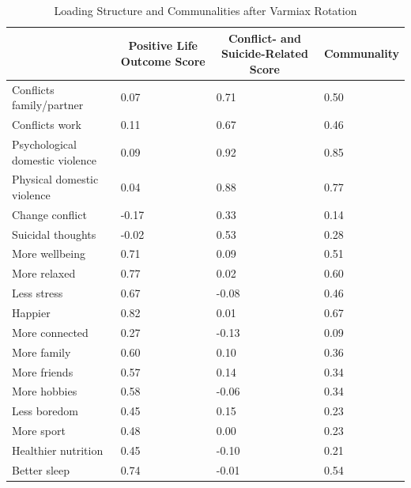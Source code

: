 \documentclass[
  english,
  jou,floatsintext]{apa7}
\begin{document}
\begin{table}[tbp]

\begin{center}
\begin{threeparttable}

\caption{\label{tab:loading}Loading Structure and Communalities after Varmiax Rotation}

\small{

\begin{tabular}{llll}
\toprule
 & \multicolumn{1}{c}{Positive Life Outcome Score} & \multicolumn{1}{c}{Conflict- and Suicide-Related Score} & \multicolumn{1}{c}{Communality}\\
\midrule
Conflicts family/partner & 0.07 & 0.71 & 0.50\\
Conflicts work & 0.11 & 0.67 & 0.46\\
Psychological domestic violence & 0.09 & 0.92 & 0.85\\
Physical domestic violence & 0.04 & 0.88 & 0.77\\
Change conflict & -0.17 & 0.33 & 0.14\\
Suicidal thoughts & -0.02 & 0.53 & 0.28\\
More wellbeing & 0.71 & 0.09 & 0.51\\
More relaxed & 0.77 & 0.02 & 0.60\\
Less stress & 0.67 & -0.08 & 0.46\\
Happier & 0.82 & 0.01 & 0.67\\
More connected & 0.27 & -0.13 & 0.09\\
More family & 0.60 & 0.10 & 0.36\\
More friends & 0.57 & 0.14 & 0.34\\
More hobbies & 0.58 & -0.06 & 0.34\\
Less boredom & 0.45 & 0.15 & 0.23\\
More sport & 0.48 & 0.00 & 0.23\\
Healthier nutrition & 0.45 & -0.10 & 0.21\\
Better sleep & 0.74 & -0.01 & 0.54\\
\bottomrule
\end{tabular}

}

\end{threeparttable}
\end{center}

\end{table}
\end{document}
